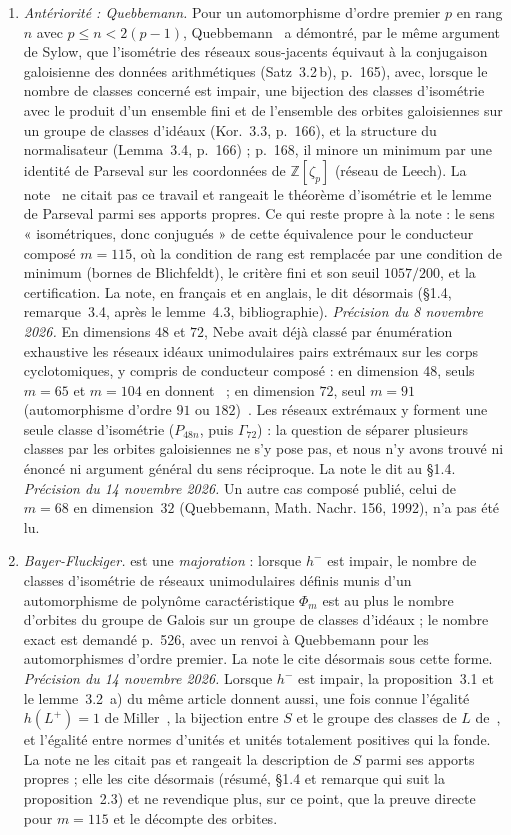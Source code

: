 \documentclass[11pt,a4paper]{amsart}
\theoremstyle{plain}
\theoremstyle{definition}
\newcommand{\Z}{\mathbb{Z}}
\begin{document}
\begin{enumerate}[label=\textup{(\arabic*)}]
\item \emph{Antériorité : Quebbemann.} Pour un automorphisme d'ordre premier $p$ en rang $n$ avec $p\le n<2(p-1)$, Quebbemann~\cite[\S3]{Que81} a démontré, par le même argument de Sylow, que l'isométrie des réseaux sous-jacents équivaut à la conjugaison galoisienne des données arithmétiques (Satz~3.2\,b), p.~165), avec, lorsque le nombre de classes concerné est impair, une bijection des classes d'isométrie avec le produit d'un ensemble fini et de l'ensemble des orbites galoisiennes sur un groupe de classes d'idéaux (Kor.~3.3, p.~166), et la structure du normalisateur (Lemma~3.4, p.~166) ; p.~168, il minore un minimum par une identité de Parseval sur les coordonnées de $\Z[\zeta_p]$ (réseau de Leech). La note~\cite{Gau26} ne citait pas ce travail et rangeait le théorème d'isométrie et le lemme de Parseval parmi ses apports propres. Ce qui reste propre à la note : le sens « isométriques, donc conjugués » de cette équivalence pour le conducteur composé $m=115$, où la condition de rang est remplacée par une condition de minimum (bornes de Blichfeldt), le critère fini et son seuil $1057/200$, et la certification. La note, en français et en anglais, le dit désormais (\S1.4, remarque~3.4, après le lemme~4.3, bibliographie). \emph{Précision du 8 novembre 2026.} En dimensions $48$ et $72$, Nebe avait déjà classé par énumération exhaustive les réseaux idéaux unimodulaires pairs extrémaux sur les corps cyclotomiques, y compris de conducteur composé : en dimension $48$, seuls $m=65$ et $m=104$ en donnent~\cite[th.~5.3]{Neb13} ; en dimension $72$, seul $m=91$ (automorphisme d'ordre $91$ ou $182$)~\cite[th.~4.5]{Neb16}. Les réseaux extrémaux y forment une seule classe d'isométrie ($P_{48n}$, puis $\Gamma_{72}$) : la question de séparer plusieurs classes par les orbites galoisiennes ne s'y pose pas, et nous n'y avons trouvé ni énoncé ni argument général du sens réciproque. La note le dit au \S1.4. \emph{Précision du 14 novembre 2026.} Un autre cas composé publié, celui de~$m=68$ en dimension~$32$ (Quebbemann, Math. Nachr. 156, 1992), n'a pas été lu.
\item \emph{Bayer-Fluckiger.} \cite[cor.~3.3]{Bay84} est une \emph{majoration} : lorsque $h^-$ est impair, le nombre de classes d'isométrie de réseaux unimodulaires définis munis d'un automorphisme de polynôme caractéristique $\Phi_m$ est au plus le nombre d'orbites du groupe de Galois sur un groupe de classes d'idéaux ; le nombre exact est demandé p.~526, avec un renvoi à Quebbemann pour les automorphismes d'ordre premier. La note le cite désormais sous cette forme. \emph{Précision du 14 novembre 2026.} Lorsque $h^-$ est impair, la proposition~3.1 et le lemme~3.2~a) du même article donnent aussi, une fois connue l'égalité $h(L^+)=1$ de Miller~\cite{Mil14}, la bijection entre $S$ et le groupe des classes de $L$ de~\cite[prop.~2.3]{Gau26}, et l'égalité entre normes d'unités et unités totalement positives qui la fonde. La note ne les citait pas et rangeait la description de $S$ parmi ses apports propres ; elle les cite désormais (résumé, \S1.4 et remarque qui suit la proposition~2.3) et ne revendique plus, sur ce point, que la preuve directe pour $m=115$ et le décompte des orbites.

\end{enumerate}
\end{document}
